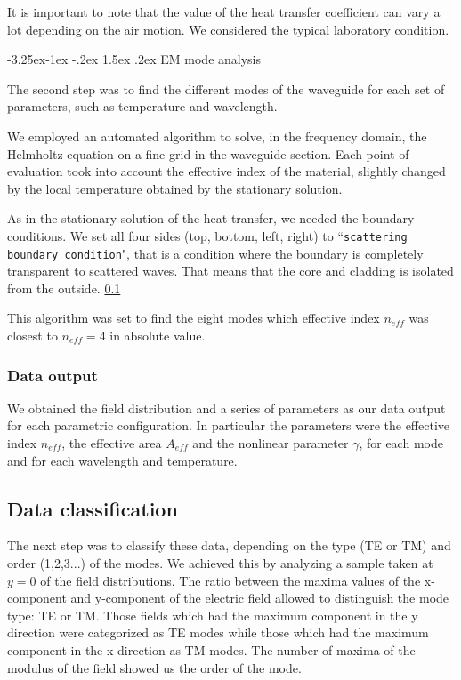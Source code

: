 \documentclass[12pt,a4paper,twoside]{article}
\makeatletter
\renewcommand\paragraph{
   \@startsection{paragraph}{4}{\z@}%
   {-3.25ex\@plus -1ex \@minus -.2ex}%
   {1.5ex \@plus .2ex}%
   {\normalfont\normalsize\bfseries}}
\makeatother
\begin{document}
It is important to note that the value of the heat transfer coefficient can vary a lot depending on the air motion.
We considered the typical laboratory condition.

\paragraph{EM mode analysis}

The second step was to find the different modes of the waveguide for each set of parameters, such as temperature and wavelength.

We employed an automated algorithm to solve, in the frequency domain, the Helmholtz equation on a fine grid in the waveguide section.
Each point of evaluation took into account the effective index of the material, slightly changed by the local temperature obtained by the stationary solution.

As in the stationary solution of the heat transfer, we needed the boundary conditions.
We set all four sides (top, bottom, left, right) to ``\texttt{scattering boundary condition}", that is a condition where the boundary is completely transparent to scattered waves.
That means that the core and cladding is isolated from the outside. \ref{}

This algorithm was set to find the eight modes which effective index $n_{eff}$ was closest to $n_{eff}=4$ in absolute value.
\subsubsection{Data output}
We obtained the field distribution and a series of parameters as our data output for each parametric configuration.
In particular the parameters were the effective index $n_{eff}$, the effective area $A_{eff}$ and the nonlinear parameter $\gamma$, for each mode and for each wavelength and temperature.

\subsection{Data classification}
The next step was to classify these data, depending on the type (TE or TM) and order (1,2,3...) of the modes.
We achieved this by analyzing a sample taken at $y=0$ of the field distributions.
The ratio between the maxima values of the x-component and y-component of the electric field allowed to distinguish the mode type: TE or TM.
Those fields which had the maximum component in the y direction were categorized as TE modes while those which had the maximum component in the x direction as TM modes.
The number of maxima of the modulus of the field showed us the order of the mode.
\end{document}
